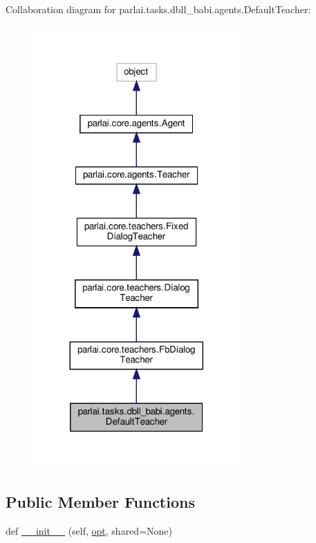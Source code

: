 Collaboration diagram for parlai.\+tasks.\+dbll\+\_\+babi.\+agents.\+Default\+Teacher\+:
\nopagebreak
\begin{figure}[H]
\begin{center}
\leavevmode
\includegraphics[width=224pt]{d1/d37/classparlai_1_1tasks_1_1dbll__babi_1_1agents_1_1DefaultTeacher__coll__graph}
\end{center}
\end{figure}
\subsection*{Public Member Functions}
\begin{DoxyCompactItemize}
\item 
def \hyperlink{classparlai_1_1tasks_1_1dbll__babi_1_1agents_1_1DefaultTeacher_ab7d8ee5ef045a12162f79ec74898bca0}{\+\_\+\+\_\+init\+\_\+\+\_\+} (self, \hyperlink{classparlai_1_1core_1_1teachers_1_1FbDialogTeacher_af7a9ec497b9cd0292d7b8fa220da7c28}{opt}, shared=None)
\end{DoxyCompactItemize}
